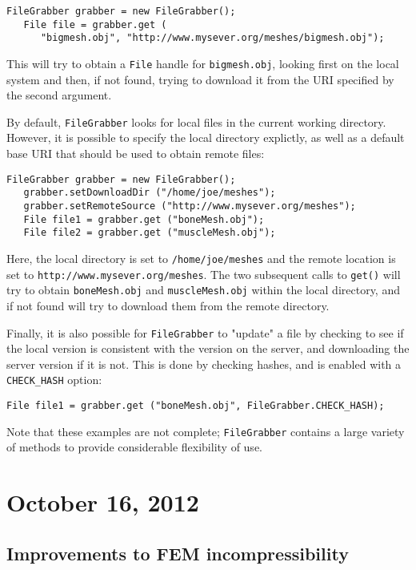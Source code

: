 \documentclass{article}
\begin{document}
\begin{lstlisting}[]
   FileGrabber grabber = new FileGrabber();
   File file = grabber.get (
      "bigmesh.obj", "http://www.mysever.org/meshes/bigmesh.obj");
\end{lstlisting}
This will try to obtain a {\tt File} handle for {\tt bigmesh.obj},
looking first on the local system and then, if not found, trying to
download it from the URI specified by the second argument.

By default, {\tt FileGrabber} looks for local files in the current
working directory. However, it is possible to specify the local
directory explictly, as well as a default base URI that should be used
to obtain remote files:

\begin{lstlisting}[]
   FileGrabber grabber = new FileGrabber();
   grabber.setDownloadDir ("/home/joe/meshes");
   grabber.setRemoteSource ("http://www.mysever.org/meshes");
   File file1 = grabber.get ("boneMesh.obj");
   File file2 = grabber.get ("muscleMesh.obj");
\end{lstlisting}
Here, the local directory is set to {\tt /home/joe/meshes}
and the remote location is set
to {\tt http://www.mysever.org/meshes}. The two subsequent
calls to {\tt get()} will try to obtain {\tt boneMesh.obj}
and {\tt muscleMesh.obj} within the local directory,
and if not found will try to download them from the
remote directory.

Finally, it is also possible for {\tt FileGrabber} to "update" a
file by checking to see if the local version is consistent with the
version on the server, and downloading the server version if it is
not. This is done by checking hashes, and is enabled with a 
{\tt CHECK\_HASH} option:
\begin{lstlisting}[]
   File file1 = grabber.get ("boneMesh.obj", FileGrabber.CHECK_HASH);
\end{lstlisting}

Note that these examples are not complete; {\tt FileGrabber} contains a large
variety of methods to provide considerable flexibility of use.

\section*{October 16, 2012}

\subsection*{Improvements to FEM incompressibility}
\end{document}
